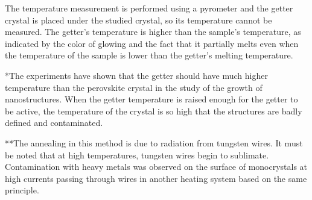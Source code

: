 \begin{sidewaystable}[]
{\begin{tabular}{@{}lllllll@{}}
		\end{tabular}}
		\begin{tablenotes}
			\small
			\item *The temperature measurement is performed using a pyrometer and the getter crystal is placed under the studied crystal, so its temperature cannot be measured. The getter's temperature is higher than the sample's temperature, as indicated by the color of glowing and the fact that it partially melts even when the temperature of the sample is lower than the getter's melting temperature. 
			\item **The experiments have shown that the getter should have much higher temperature than the perovskite crystal in the study of the growth of nanostructures. When the getter temperature is raised enough for the getter to be active, the temperature of the crystal is so high that the structures are badly defined and contaminated. 
			\item ***The annealing in this method is due to radiation from tungsten wires. It must      be noted that at      high temperatures, tungsten wires begin to sublimate. Contamination with heavy metals was  observed on the surface of monocrystals at high currents passing through wires in another heating system based on the same principle.
		\end{tablenotes}	
\end{sidewaystable}

\endgroup




